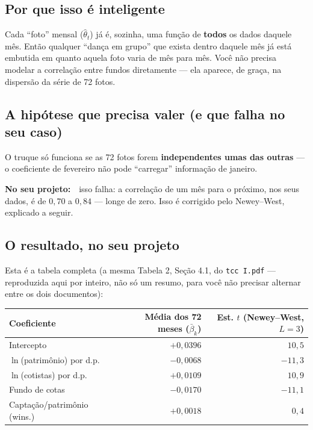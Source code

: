 \documentclass[11pt,a4paper]{article}
\newcommand{\noprojeto}[0]{\par\vspace{4pt}\noindent\textbf{No seu projeto:}\ }
\begin{document}
\subsection{Por que isso é inteligente}

Cada ``foto'' mensal ($\widehat\theta_t$) já é, sozinha, uma função de \textbf{todos} os dados
daquele mês. Então qualquer ``dança em grupo'' que exista dentro daquele mês já está embutida em
quanto aquela foto varia de mês para mês. Você não precisa modelar a correlação entre fundos
diretamente --- ela aparece, de graça, na dispersão da série de 72 fotos.

\subsection{A hipótese que precisa valer (e que falha no seu caso)}

O truque só funciona se as 72 fotos forem \textbf{independentes umas das outras} --- o
coeficiente de fevereiro não pode ``carregar'' informação de janeiro. \noprojeto\ isso falha:
a correlação de um mês para o próximo, nos seus dados, é de $0{,}70$ a $0{,}84$ --- longe de
zero. Isso é corrigido pelo Newey--West, explicado a seguir.

\subsection{O resultado, no seu projeto}

Esta é a tabela completa (a mesma Tabela 2, Seção 4.1, do \texttt{tcc I.pdf} --- reproduzida aqui
por inteiro, não só um resumo, para você não precisar alternar entre os dois documentos):

\begin{center}\small
\begin{tabular}{@{}lrr@{}}
\toprule
Coeficiente & Média dos 72 meses ($\bar\beta_k$) & Est. $t$ (Newey--West, $L=3$) \\
\midrule
Intercepto                 & $+0{,}0396$ & $10{,}5$ \\
$\ln$(patrimônio) por d.p. & $-0{,}0068$ & $-11{,}3$ \\
$\ln$(cotistas) por d.p.   & $+0{,}0109$ & $10{,}9$ \\
Fundo de cotas              & $-0{,}0170$ & $-11{,}1$ \\
Captação/patrimônio (wins.) & $+0{,}0018$ & $0{,}4$ \\
\bottomrule
\end{tabular}
\end{center}
\end{document}
